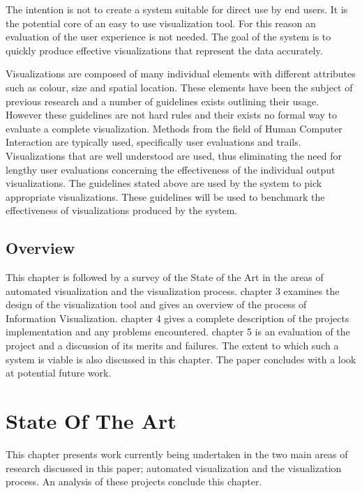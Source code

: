 \documentclass[a4paper, 11pt, titlepage, onehalfspacing]{report}
\begin{document}
The intention is not to create a system suitable for direct use by end users. It is the potential core of an easy to use visualization tool. For this reason an evaluation of the user experience is not needed. The goal of the system is to quickly produce effective visualizations that represent the data accurately.

Visualizations are composed of many individual elements with different attributes such as colour, size and spatial location. These elements have been the subject of previous research and a number of guidelines exists outlining their usage. However these guidelines are not hard rules and their exists no formal way to evaluate a complete visualization. Methods from the field of Human Computer Interaction are typically used, specifically user evaluations and trails. Visualizations that are well understood are used, thus eliminating the need for lengthy user evaluations concerning the effectiveness of the individual output visualizations. The guidelines stated above are used by the system to pick appropriate visualizations. These guidelines will be used to benchmark the effectiveness of visualizations produced by the system.

	\section{Overview}
 
This chapter is followed by a survey of the State of the Art in the areas of automated visualization and the visualization process. chapter 3 examines the design of the visualization tool and gives an overview of the process of Information Visualization. chapter 4 gives a complete description of the projects implementation and any problems encountered. chapter 5 is an evaluation of the project and a discussion of its merits and failures. The extent to which such a system is viable is also discussed in this chapter. The paper concludes with a look at potential future work.


	\chapter{State Of The Art}

This chapter presents work currently being undertaken in the two main areas of research discussed in this paper; automated visualization and the visualization process. An analysis of these projects conclude this chapter.
\end{document}
